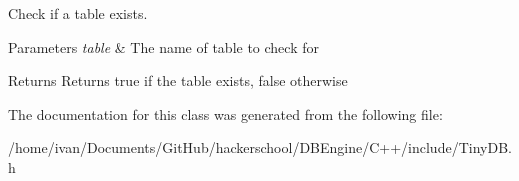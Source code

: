 Check if a table exists. 


\begin{DoxyParams}{Parameters}
{\em table} & The name of table to check for \\
\hline
\end{DoxyParams}
\begin{DoxyReturn}{Returns}
Returns true if the table exists, false otherwise 
\end{DoxyReturn}


The documentation for this class was generated from the following file\-:\begin{DoxyCompactItemize}
\item 
/home/ivan/\-Documents/\-Git\-Hub/hackerschool/\-D\-B\-Engine/\-C++/include/Tiny\-D\-B.\-h\end{DoxyCompactItemize}
